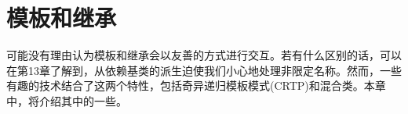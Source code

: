 \chapter{模板和继承}
可能没有理由认为模板和继承会以友善的方式进行交互。若有什么区别的话，可以在第13章了解到，从依赖基类的派生迫使我们小心地处理非限定名称。然而，一些有趣的技术结合了这两个特性，包括奇异递归模板模式(CRTP)和混合类。本章中，将介绍其中的一些。




